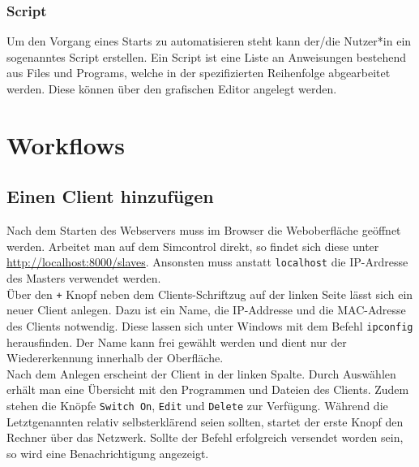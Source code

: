 \documentclass[accentcolor=tud1c, paper=a4, colorback]{tudreport}
\newcommand{\ind}[1]{#1\index{#1}}
\begin{document}
	\subsection{\ind{Script}}
	Um den Vorgang eines Starts zu automatisieren steht kann der/die Nutzer*in ein sogenanntes Script erstellen.
	Ein Script ist eine Liste an Anweisungen bestehend aus Files und Programs, welche in der spezifizierten
	Reihenfolge abgearbeitet werden. Diese können über den grafischen Editor angelegt werden.

	\chapter{Workflows}
	\section{Einen Client hinzufügen}
	Nach dem Starten des Webservers muss im Browser die Weboberfläche geöffnet werden.
	Arbeitet man auf dem \ind{Simcontrol} direkt, so findet sich diese unter
	\url{http://localhost:8000/slaves}. Ansonsten muss anstatt \texttt{localhost}
	die \ind{IP-Ardresse} des Masters verwendet werden.
	\\
	Über den \texttt{+} Knopf neben dem Clients-Schriftzug auf der linken Seite
	lässt sich ein neuer Client anlegen. Dazu ist ein Name, die IP-Addresse und
	die MAC-Adresse des Clients notwendig. Diese lassen sich unter Windows
	mit dem Befehl \texttt{ipconfig} herausfinden. Der Name kann frei gewählt
	werden und dient nur der Wiedererkennung innerhalb der Oberfläche.
	\\
	Nach dem Anlegen erscheint der Client in der linken Spalte. Durch Auswählen erhält
	man eine Übersicht mit den Programmen und Dateien des Clients. Zudem stehen die
	Knöpfe \texttt{Switch On}, \texttt{Edit} und \texttt{Delete} zur Verfügung.
	Während die Letztgenannten relativ selbsterklärend seien sollten, startet der
	erste Knopf den Rechner über das Netzwerk. Sollte der Befehl erfolgreich
	versendet worden sein, so wird eine Benachrichtigung angezeigt.
\end{document}
